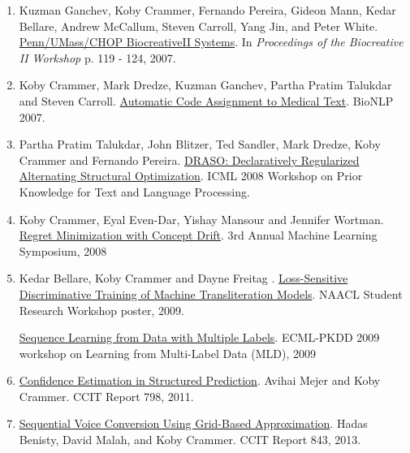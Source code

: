 \documentclass{resume}
\begin{document}
\begin{enumerate}
\item
Kuzman Ganchev, {Koby Crammer},
Fernando Pereira, Gideon Mann, Kedar Bellare, Andrew McCallum, Steven
Carroll, Yang Jin, and Peter White.
\href{http://www.cis.upenn.edu/~crammer/publications/biocreativeII07.pdf}{Penn/UMass/CHOP BiocreativeII Systems}.
In {\em Proceedings of the Biocreative II  Workshop} p. 119 - 124, 2007.

\item
{Koby Crammer}, Mark Dredze, Kuzman Ganchev, Partha Pratim
  Talukdar and Steven Carroll.
\href{http://www.cis.upenn.edu/~crammer/publications/cmc_bionlp07.pdf}{Automatic Code Assignment to Medical Text}.
BioNLP 2007.
\item
Partha Pratim Talukdar, John Blitzer, Ted Sandler, Mark Dredze, {Koby Crammer} and Fernando Pereira.
\href{http://www.cis.upenn.edu/~crammer/publications/icml08_draso.pdf}{DRASO: Declaratively Regularized Alternating Structural Optimization}.
ICML 2008 Workshop on Prior Knowledge for Text and Language Processing.

\item {Koby Crammer}, Eyal Even-Dar, Yishay Mansour and Jennifer Wortman.
\href{}{Regret Minimization with Concept Drift}. 3rd Annual Machine Learning Symposium, 2008
\item
Kedar Bellare, {Koby Crammer } and Dayne Freitag .
\href{http://www.cis.upenn.edu/~crammer/publications/miraed_09.pdf}{Loss-Sensitive Discriminative Training of Machine Transliteration Models}. NAACL Student Research Workshop poster, 2009.

\href{http://webee.technion.ac.il/people/koby/publications/mld09_multi_label.pdf}{Sequence Learning from Data with Multiple Labels}.
ECML-PKDD 2009 workshop on Learning from Multi-Label Data (MLD), 2009
\item
\href{http://webee.technion.ac.il/publication-link/index/id/596/abstract/1}{Confidence Estimation in Structured Prediction}.
Avihai Mejer and {Koby Crammer}.
CCIT Report 798, 2011.

\item
\href{webee.technion.ac.il/publication-link/index/id/641}{Sequential Voice Conversion Using Grid-Based Approximation}.
Hadas Benisty, David Malah, and {Koby Crammer}.
CCIT Report 843, 2013.
\end{enumerate}
\end{document}

